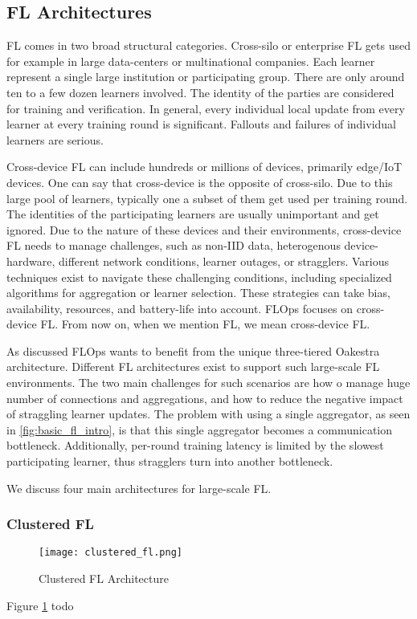 \subsection{FL Architectures}

FL comes in two broad structural categories.
Cross-silo or enterprise FL gets used for example in large data-centers or multinational companies.
Each learner represent a single large institution or participating group.
There are only around ten to a few dozen learners involved.
The identity of the parties are considered for training and verification.
In general, every individual local update from every learner at every training round is significant.
Fallouts and failures of individual learners are serious.

Cross-device FL can include hundreds or millions of devices, primarily edge/IoT devices.
One can say that cross-device is the opposite of cross-silo.
Due to this large pool of learners, typically one a subset of them get used per training round.
The identities of the participating learners are usually unimportant and get ignored.
Due to the nature of these devices and their environments, cross-device FL
needs to manage challenges, such as non-IID data, heterogenous device-hardware,
different network conditions, learner outages, or stragglers.
Various techniques exist to navigate these challenging conditions,
including specialized algorithms for aggregation or learner selection.
These strategies can take bias, availability, resources, and battery-life into account.
FLOps focuses on cross-device FL.
From now on, when we mention FL, we mean cross-device FL.

As discussed FLOps wants to benefit from the unique three-tiered Oakestra \cite{paper:oakestra_usenix} architecture.
Different FL architectures exist to support such large-scale FL environments.
The two main challenges for such scenarios are how o manage huge number of connections and aggregations,
and how to reduce the negative impact of straggling learner updates.
The problem with using a single aggregator, as seen in \ref{fig:basic_fl_intro}, is
that this single aggregator becomes a communication bottleneck.
Additionally, per-round training latency is limited by the slowest participating learner,
thus stragglers turn into another bottleneck.

We discuss four main architectures for large-scale FL.

\subsubsection{Clustered FL}

\begin{figure}[h]
    \centering
    \texttt{[image: clustered\_fl.png]}
    \caption{Clustered FL Architecture}
    \label{fig:clustered_fl}
\end{figure}
Figure \ref{fig:clustered_fl} todo

